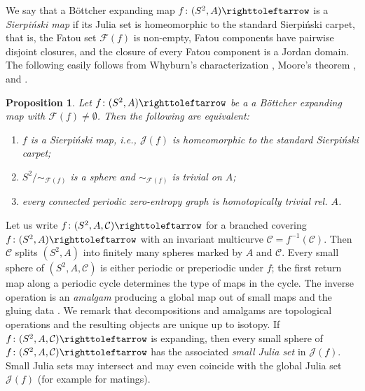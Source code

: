 \documentclass{amsart}
\theoremstyle{plain}
\newtheorem{proposition}[theorem]{Proposition}
\theoremstyle{definition}
\theoremstyle{remark}
\newcommand{\Fat}{{\mathcal F}}
\newcommand{\Jul}{{\mathcal J}}
\newcommand{\CC}{{\mathcal C}}
\newcommand\selfmap{\righttoleftarrow}
\begin{document}
We say that a  B\"ottcher expanding map  $f\colon(S^2,A)\selfmap$ is a \emph{Sierpi\'{n}ski map} if its Julia set is homeomorphic to the standard Sierpi\'{n}ski carpet,  that is,   the Fatou set $\Fat(f)$ is non-empty,  Fatou components have pairwise disjoint closures, and the closure of every Fatou component is a Jordan domain.  The following easily follows from Whyburn's characterization \cite{Why}, Moore's theorem \cite{Moore,WhyBook}, and \cite[Section~4.5]{BD_Exp}.



\begin{proposition}
\label{thm:sierpinski}
Let $f\colon(S^2,A)\selfmap$ be a a B\"ottcher expanding map with $\Fat(f)\not=\emptyset$. Then the following are equivalent:
\begin{enumerate}[label=\text{(\roman*)},font=\normalfont,leftmargin=*]
\item $f$ is a Sierpi\'{n}ski map, i.e., $\Jul(f)$ is homeomorphic to the standard Sierpi\'{n}ski carpet;
\item $S^2/\sim_{\Fat(f)}$ is a sphere and $\sim_{\Fat(f)}$ is trivial on $A$;
\item every connected periodic zero-entropy graph is homotopically trivial rel.  $A$. 
\end{enumerate}
\end{proposition}






  Let us write $f\colon(S^2,A,\CC)\selfmap$ for a branched covering $f\colon(S^2,A)\selfmap$ with an invariant multicurve $\CC=f^{-1}(\CC)$. Then $\CC$ splits $(S^2,A)$ into finitely many spheres marked by $A$ and $\CC$. Every small sphere of $(S^2,A,\CC)$ is either periodic or preperiodic under $f$; the first return map along a periodic cycle determines the type of maps in the cycle. The inverse operation is an \emph{amalgam}  producing a global map out of small maps and the gluing data \cite{Pilgrim_Comb}. We remark that decompositions and  amalgams are topological operations and the resulting objects are unique up to isotopy. If $f\colon(S^2,A,\CC)\selfmap$ is expanding, then every small sphere of $f\colon(S^2,A,\CC)\selfmap$ has the associated \emph{small Julia set} in $\Jul(f)$. Small Julia sets may intersect and may even coincide with the global Julia set $\Jul(f)$ (for example for matings).  
  
\end{document}
